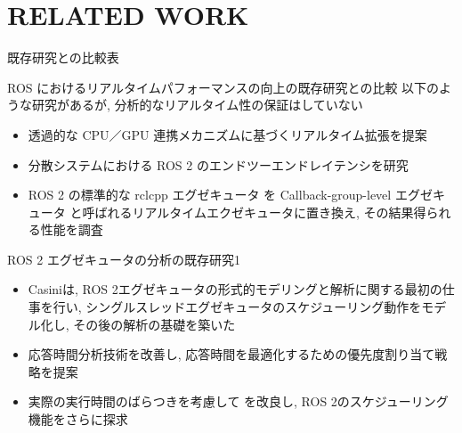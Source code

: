 
\section{RELATED WORK}
\label{sec: related work}


\begin{frame}{既存研究との比較表}
\end{frame}


\begin{frame}{ROS におけるリアルタイムパフォーマンスの向上の既存研究との比較}
    以下のような研究があるが, 分析的なリアルタイム性の保証はしていない
    \begin{itemize}
        \item 透過的な CPU／GPU 連携メカニズムに基づくリアルタイム拡張を提案 \cite{suzuki2018real}
        \item 分散システムにおける ROS 2 のエンドツーエンドレイテンシを研究 \cite{kronauer2021latency}
        \item ROS 2 の標準的な rclcpp エグゼキュータ を Callback-group-level エグゼキュータ と呼ばれるリアルタイムエクゼキュータに置き換え, その結果得られる性能を調査 \cite{yang2020exploring}
    \end{itemize}
\end{frame}

\begin{frame}{ROS 2 エグゼキュータの分析の既存研究1}
    \begin{itemize}
        \item Casiniは, ROS 2エグゼキュータの形式的モデリングと解析に関する最初の仕事を行い, シングルスレッドエグゼキュータのスケジューリング動作をモデル化し, その後の解析の基礎を築いた \cite{park2021ros2}
        \item 応答時間分析技術を改善し, 応答時間を最適化するための優先度割り当て戦略を提案 \cite{tang2020response}
        \item 実際の実行時間のばらつきを考慮して \cite{park2021ros2} を改良し, ROS 2のスケジューリング機能をさらに探求 \cite{blass2021ros}
    \end{itemize}
\end{frame}

